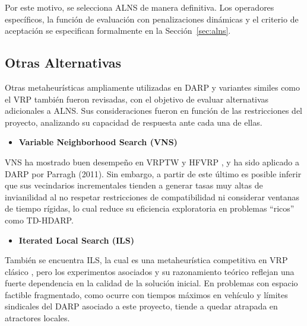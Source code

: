 Por este motivo, se selecciona ALNS de manera definitiva. Los operadores específicos, la función de evaluación con penalizaciones dinámicas y el criterio de aceptación se especifican formalmente en la Sección~\ref{sec:alns}.

\subsection{Otras Alternativas}
Otras metaheurísticas ampliamente utilizadas en DARP y variantes similes como el VRP también fueron revisadas, con el objetivo de evaluar alternativas adicionales a ALNS. Sus consideraciones fueron en función de las restricciones del proyecto, analizando su capacidad de respuesta ante cada una de ellas.

\begin{itemize}
    \item \textbf{Variable Neighborhood Search (VNS)}
\end{itemize}

VNS ha mostrado buen desempeño en VRPTW y HFVRP \cite{Hansen2010}, y ha sido aplicado a DARP por Parragh (2011). Sin embargo, a partir de este último es posible inferir que sus vecindarios incrementales tienden a generar tasas muy altas de invianilidad al no respetar restricciones de compatibilidad ni considerar ventanas de tiempo rígidas, lo cual reduce su eficiencia exploratoria en problemas “ricos” como TD-HDARP.

\begin{itemize}
    \item \textbf{Iterated Local Search (ILS)}
\end{itemize}

También se encuentra ILS, la cual es una metaheurística competitiva en VRP clásico \cite{Lourenco2003}, pero los experimentos asociados y su razonamiento teórico reflejan una fuerte dependencia en la calidad de la solución inicial. En problemas con espacio factible fragmentado, como ocurre con tiempos máximos en vehículo y límites sindicales del DARP asociado a este proyecto, tiende a quedar atrapada en atractores locales.

